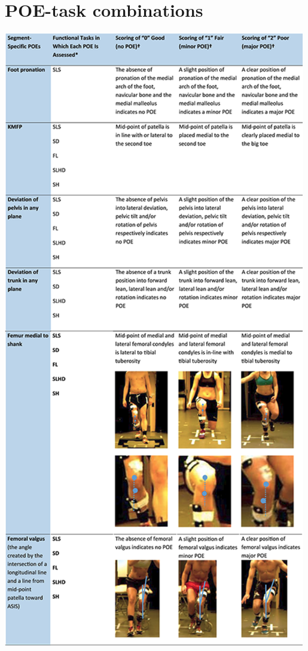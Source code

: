\appendix


\chapter[POE-task combinations]{POE-task combinations \cite{Nae2020b}} \label{app:poe-task}
  \begin{center}
    \includegraphics[trim=0 60 0 0, clip, height=0.9\textheight]{files/figs/app/poes-detailed-rot.png}
  \end{center}
